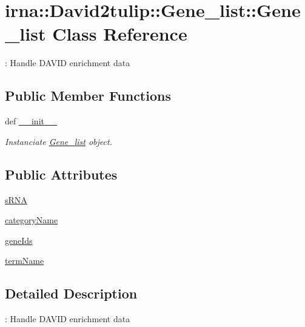 \hypertarget{classirna_1_1David2tulip_1_1Gene__list_1_1Gene__list}{
\section{irna\-:\-:\-David2tulip\-:\-:\-Gene\-\_\-list\-:\-:\-Gene\-\_\-list \-Class \-Reference}
\label{classirna_1_1David2tulip_1_1Gene__list_1_1Gene__list}
}


\-: \-Handle \-D\-A\-V\-I\-D enrichment data  


\subsection*{\-Public \-Member \-Functions}
\begin{DoxyCompactItemize}
\item 
def \hyperlink{classirna_1_1David2tulip_1_1Gene__list_1_1Gene__list_a5485cb5ce671af97598839833d5f70fd}{\-\_\-\-\_\-init\-\_\-\-\_\-}
\begin{DoxyCompactList}\small\item\em \-Instanciate \hyperlink{classirna_1_1David2tulip_1_1Gene__list_1_1Gene__list}{\-Gene\-\_\-list} object. \end{DoxyCompactList}\end{DoxyCompactItemize}
\subsection*{\-Public \-Attributes}
\begin{DoxyCompactItemize}
\item 
\hyperlink{classirna_1_1David2tulip_1_1Gene__list_1_1Gene__list_a363e1b6e1687eb4d34db609a14207080}{s\-R\-N\-A}
\item 
\hyperlink{classirna_1_1David2tulip_1_1Gene__list_1_1Gene__list_a274974b6ff29be308b992e13a78ee5ab}{category\-Name}
\item 
\hyperlink{classirna_1_1David2tulip_1_1Gene__list_1_1Gene__list_aa1441dc3cf5e1b3c7206e7c64a118d78}{gene\-Ids}
\item 
\hyperlink{classirna_1_1David2tulip_1_1Gene__list_1_1Gene__list_ac076f762cdb8b69bfd4d58a7dd300061}{term\-Name}
\end{DoxyCompactItemize}


\subsection{\-Detailed \-Description}
\-: \-Handle \-D\-A\-V\-I\-D enrichment data 

